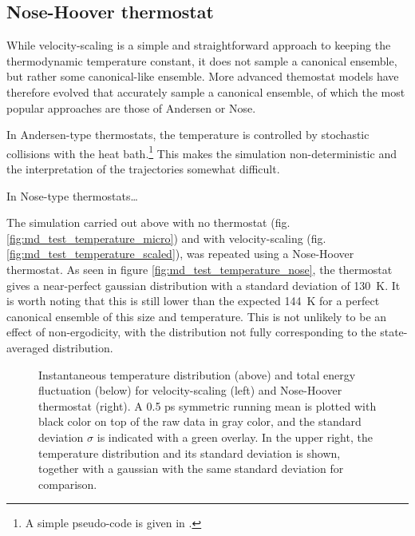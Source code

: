\documentclass[11pt,bibliography=totoc,index=totoc]{scrbook}   %
\begin{document}
\subsection{Nose-Hoover thermostat}
%

While velocity-scaling is a simple and straightforward approach to keeping the thermodynamic temperature constant, it does not sample a canonical ensemble, but rather some canonical-like ensemble. 
More advanced themostat models have therefore evolved that accurately sample a canonical ensemble, of which the most popular approaches are those of Andersen\cite{Andersen:1980} or Nose\cite{Nose:1984,Nose:1991,Bylander:1992}.

In Andersen-type thermostats, the temperature is controlled by stochastic collisions with the heat bath.\footnote{
A simple pseudo-code is given in \cite[129]{Frenkel:1996}.}
This makes the simulation non-deterministic and the interpretation of the trajectories somewhat difficult.

In Nose-type thermostats\ldots

The simulation carried out above with no thermostat (fig. \ref{fig:md_test_temperature_micro}) and with
velocity-scaling (fig. \ref{fig:md_test_temperature_scaled}), was repeated using a Nose-Hoover thermostat.
As seen in figure \ref{fig:md_test_temperature_nose}, the thermostat gives a near-perfect gaussian distribution with a standard deviation of 130~K. 
It is worth noting that this is still lower than the expected 144~K for a perfect canonical ensemble of this size and temperature. 
This is not unlikely to be an effect of non-ergodicity, with the distribution not fully corresponding to the state-averaged distribution. 


\begin{figure}[htbp]
  \centering
  \caption{
    Instantaneous temperature distribution (above) and total energy fluctuation (below) 
    for velocity-scaling (left) and Nose-Hoover thermostat (right). A 0.5 ps symmetric running mean 
    is plotted with black color on top of the raw data in gray color, and the standard deviation $\sigma$ 
    is indicated with a green overlay. In the upper right, the temperature distribution and its 
    standard deviation is shown, together with a gaussian with the same standard deviation for comparison.
   }
  \label{fig:md_test_temperature}
\end{figure}
\end{document}
